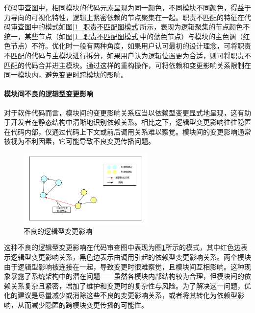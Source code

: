 代码审查图中，相同模块的代码元素呈现为同一颜色，不同模块不同颜色，得益于力导向的可视化特性，逻辑上紧密依赖的节点聚集在一起。职责不匹配的特征在代码审查图中的模式如图\ref{1_职责不匹配图模式}所示，表现为逻辑聚集的节点颜色不统一，某些节点（如图\ref{1_职责不匹配图模式}中的蓝色节点）与模块的主色调（红色节点）不符。优化时一般有两种角度，如果用户认可最初的设计理念，可将职责不匹配的代码与主模块进行拆分，如果用户认为逻辑位置更为合适，则可将职责不匹配的代码合并进主模块。通过这样的重构操作，可将依赖和变更影响关系限制在同一模块内，避免变更时跨模块的影响。


\paragraph{模块间不良的逻辑型变更影响} 对于软件代码而言，模块间的变更影响关系应当以依赖型变更显式地呈现，这有助于开发者在静态结构中清晰地识别依赖关系。相比之下，逻辑型变更影响往往隐匿在代码内部，仅通过代码上下文或前后调用关系难以察觉。模块间的变更影响通常被视为不利因素，它可能导致不良变更传播问题。

\begin{figure}[h]
\centering
\includegraphics[width = 0.6\textwidth]{figures/不良变更影响.pdf}
\caption{不良的逻辑型变更影响}
\label{1_不良的逻辑型变更影响}
\end{figure}


这种不良的逻辑型变更影响在代码审查图中表现为图\ref{1_不良的逻辑型变更影响}所示的模式，其中红色边表示逻辑型变更影响关系，黑色边表示由调用引起的依赖型变更影响关系。两个模块由于逻辑型影响被连接在一起，导致变更时很难察觉，且模块间互相影响。这种现象暴露了系统架构中的潜在问题——虽然各模块内部结构较为合理，但模块间的依赖关系复杂且紧密，增加了维护和变更时的复杂性与风险。为了解决这一问题，优化的建议是尽量减少或消除这些不良的变更影响关系，或者将其转化为依赖型影响，从而减少隐匿的跨模块变更传播的可能性。





